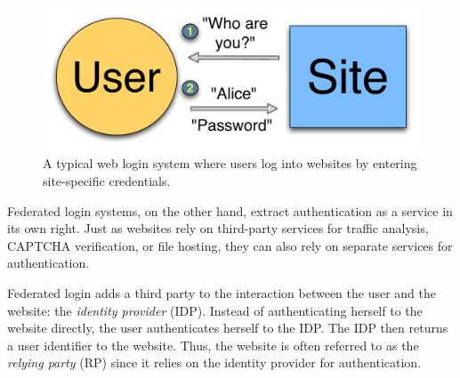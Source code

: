 \documentclass{llncs}
\begin{document}
\begin{figure}
  \centering
  \includegraphics[scale=0.5]{figs/fig-passwd-color.pdf}
  \caption{A typical web login system where users log into websites by
    entering site-specific credentials. }
  \label{fig:passwd}
\end{figure}

Federated login systems, on the other hand, extract authentication as
a service in its own right. Just as websites rely on third-party services
for traffic analysis, CAPTCHA verification, or file hosting, they can
also rely on separate services for authentication.

Federated login adds a third party to the interaction between the user
and the website: the \emph{identity provider} (IDP). Instead of
authenticating herself to the website directly, the user authenticates
herself to the IDP. The IDP then returns a user identifier to the
website. Thus, the website is often referred to as the \emph{relying
  party} (RP) since it relies on the identity provider for
authentication.
\end{document}
